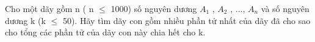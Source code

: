 Cho một dãy gồm n ( n  $\le$  1000) số nguyên dương $A_{1}$   , $A_{2}$   , ..., $A_{n}$   và số nguyên dương k (k  $\le$  50). Hãy tìm dãy con gồm nhiều phần tử nhất của dãy đã cho sao cho tổng các phần tử của dãy con này chia hết cho k.